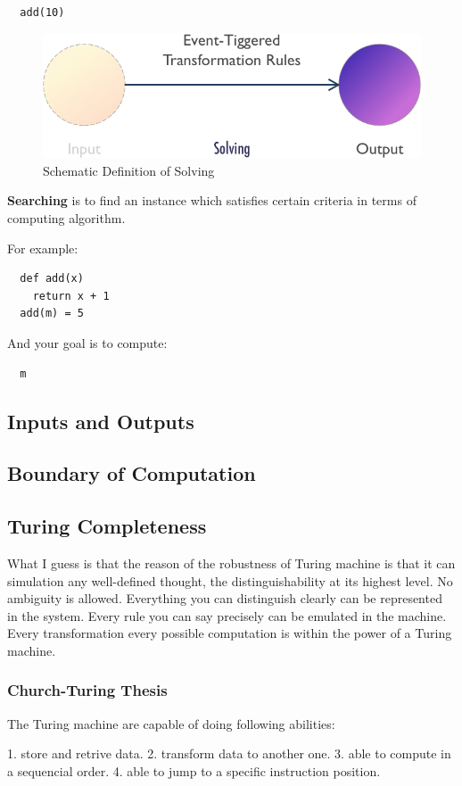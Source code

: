 \begin{verbatim}
  add(10)
\end{verbatim}

\begin{figure}
  \includegraphics[width=\linewidth]{img/solving.png}
  \caption{Schematic Definition of Solving}
  \label{fig:solving}
\end{figure}

\textbf{Searching} is to find an instance which satisfies certain criteria in terms of computing algorithm.

For example:
\begin{verbatim}
  def add(x)
    return x + 1
  add(m) = 5
\end{verbatim}

And your goal is to compute:

\begin{verbatim}
  m
\end{verbatim}

\subsection{Inputs and Outputs}



\subsection{Boundary of Computation}
\subsection*{Turing Completeness}

What I guess is that the reason of the robustness of Turing machine is that it can simulation any well-defined thought, the distinguishability at its highest level. No ambiguity is allowed. Everything you can distinguish clearly can be represented in the system. Every rule you can say precisely can be emulated in the machine. Every transformation  every possible computation is within the power of a Turing machine.
\subsubsection*{Church-Turing Thesis}

The Turing machine are capable of doing following abilities:

1. store and retrive data.
2. transform  data to another one.
3. able to compute in a sequencial order.
4. able to jump to a specific instruction position.


